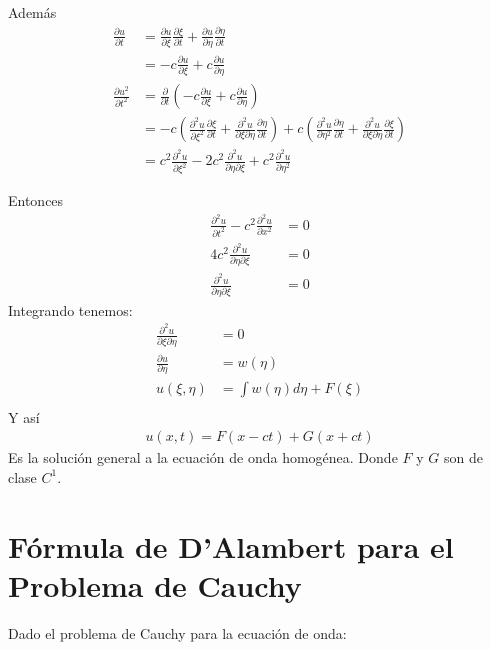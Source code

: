 \documentclass[11pt]{book}
\theoremstyle{plain}
\theoremstyle{definition}
\begin{document}
Además
\begin{align*}
    \frac{\partial u}{\partial t} &= \frac{\partial u}{\partial \xi} \frac{\partial \xi}{\partial t} + \frac{\partial u}{\partial \eta} \frac{\partial \eta}{\partial t} \\
    &= -c \frac{\partial u}{\partial \xi} + c \frac{\partial u}{\partial \eta}\\
    \frac{\partial u^{2}}{\partial t^{2}} &= \frac{\partial}{\partial t} \left(  -c \frac{\partial u}{\partial \xi} + c \frac{\partial u}{\partial \eta} \right) \\
    &= -c\left(\frac{\partial^{2} u}{\partial \xi^{2}}\frac{\partial \xi}{\partial t} + \frac{\partial^{2} u}{\partial \xi \partial \eta}\frac{\partial \eta}{\partial t} \right) +c \left(\frac{\partial^{2} u}{\partial \eta^{2}}\frac{\partial \eta}{\partial t} + \frac{\partial^{2} u}{\partial \xi \partial \eta}\frac{\partial \xi}{\partial t} \right)\\
    &= c^{2}\frac{\partial^{2} u}{\partial \xi^{2}} - 2c^{2}\frac{\partial^{2} u}{\partial \eta \partial \xi} + c^{2}\frac{\partial^{2} u}{\partial \eta^{2}}
\end{align*}

Entonces
\begin{align*}
    \frac{\partial^2 u}{\partial t^2} - c^2 \frac{\partial^2 u}{\partial x^2} &= 0\\ 
    4c^{2}\frac{\partial^{2} u}{\partial \eta \partial \xi} & = 0\\ 
    \frac{\partial^{2} u}{\partial \eta \partial \xi} & = 0
\end{align*}
Integrando tenemos:
\begin{align*}
    \frac{\partial^{2} u}{\partial \xi \partial \eta } & = 0\\
    \frac{\partial u}{\partial \eta} & = w(\eta)\\
    u(\xi,\eta) &= \int  w(\eta)d\eta + F(\xi)\\
\end{align*}
Y así
\begin{align}
    u(x,t) = F(x-ct) + G(x+ct)
\end{align}
Es la solución general a la ecuación de onda homogénea. Donde $F$ y $G$ son de clase $C^{1}$.

\newpage
\section{Fórmula de D'Alambert para el Problema de Cauchy}
Dado el problema de Cauchy para la ecuación de onda:
\end{document}
